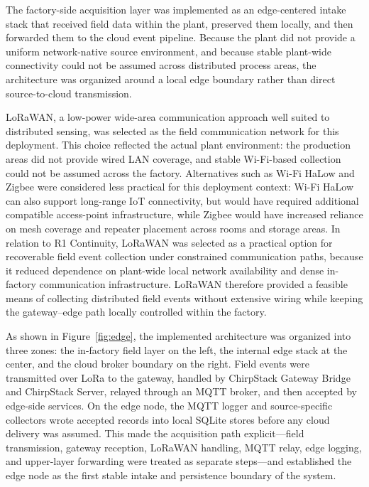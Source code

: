 \documentclass[systems,article,submit,pdftex,moreauthors]{Definitions/mdpi}
\begin{document}
The factory-side acquisition layer was implemented as an edge-centered intake stack that received field data within the plant, preserved them locally, and then forwarded them to the cloud event pipeline. Because the plant did not provide a uniform network-native source environment, and because stable plant-wide connectivity could not be assumed across distributed process areas, the architecture was organized around a local edge boundary rather than direct source-to-cloud transmission.

LoRaWAN, a low-power wide-area communication approach well suited to distributed sensing, was selected as the field communication network for this deployment. This choice reflected the actual plant environment: the production areas did not provide wired LAN coverage, and stable Wi-Fi-based collection could not be assumed across the factory. Alternatives such as Wi-Fi HaLow and Zigbee were considered less practical for this deployment context: Wi-Fi HaLow can also support long-range IoT connectivity, but would have required additional compatible access-point infrastructure, while Zigbee would have increased reliance on mesh coverage and repeater placement across rooms and storage areas. In relation to R1 Continuity, LoRaWAN was selected as a practical option for recoverable field event collection under constrained communication paths, because it reduced dependence on plant-wide local network availability and dense in-factory communication infrastructure. LoRaWAN therefore provided a feasible means of collecting distributed field events without extensive wiring while keeping the gateway--edge path locally controlled within the factory.

As shown in Figure~\ref{fig:edge}, the implemented architecture was organized into three zones: the in-factory field layer on the left, the internal edge stack at the center, and the cloud broker boundary on the right. Field events were transmitted over LoRa to the gateway, handled by ChirpStack Gateway Bridge and ChirpStack Server, relayed through an MQTT broker, and then accepted by edge-side services. On the edge node, the MQTT logger and source-specific collectors wrote accepted records into local SQLite stores before any cloud delivery was assumed. This made the acquisition path explicit---field transmission, gateway reception, LoRaWAN handling, MQTT relay, edge logging, and upper-layer forwarding were treated as separate steps---and established the edge node as the first stable intake and persistence boundary of the system.
\end{document}
